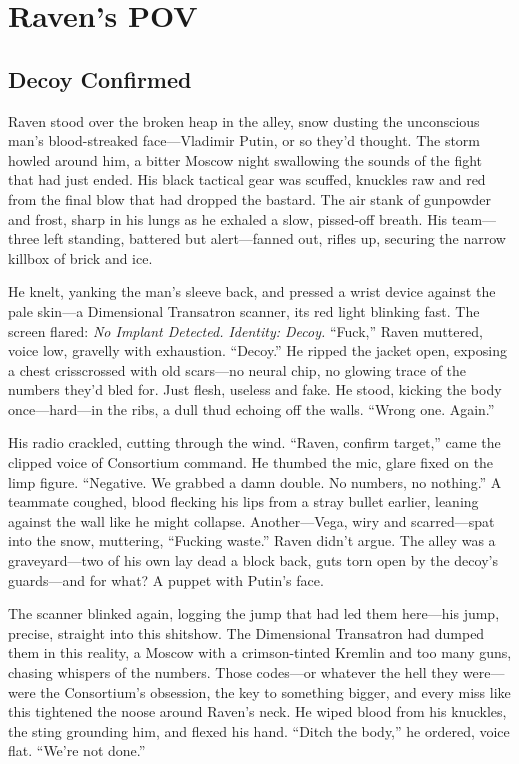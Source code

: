 \documentclass[12pt]{book}
\begin{document}
\chapter{Raven’s POV}

\section{Decoy Confirmed}

Raven stood over the broken heap in the alley, snow dusting the unconscious man’s blood-streaked face—Vladimir Putin, or so they’d thought. The storm howled around him, a bitter Moscow night swallowing the sounds of the fight that had just ended. His black tactical gear was scuffed, knuckles raw and red from the final blow that had dropped the bastard. The air stank of gunpowder and frost, sharp in his lungs as he exhaled a slow, pissed-off breath. His team—three left standing, battered but alert—fanned out, rifles up, securing the narrow killbox of brick and ice.

He knelt, yanking the man’s sleeve back, and pressed a wrist device against the pale skin—a Dimensional Transatron scanner, its red light blinking fast. The screen flared: \textit{No Implant Detected. Identity: Decoy.} “Fuck,” Raven muttered, voice low, gravelly with exhaustion. “Decoy.” He ripped the jacket open, exposing a chest crisscrossed with old scars—no neural chip, no glowing trace of the numbers they’d bled for. Just flesh, useless and fake. He stood, kicking the body once—hard—in the ribs, a dull thud echoing off the walls. “Wrong one. Again.”

His radio crackled, cutting through the wind. “Raven, confirm target,” came the clipped voice of Consortium command. He thumbed the mic, glare fixed on the limp figure. “Negative. We grabbed a damn double. No numbers, no nothing.” A teammate coughed, blood flecking his lips from a stray bullet earlier, leaning against the wall like he might collapse. Another—Vega, wiry and scarred—spat into the snow, muttering, “Fucking waste.” Raven didn’t argue. The alley was a graveyard—two of his own lay dead a block back, guts torn open by the decoy’s guards—and for what? A puppet with Putin’s face.

The scanner blinked again, logging the jump that had led them here—his jump, precise, straight into this shitshow. The Dimensional Transatron had dumped them in this reality, a Moscow with a crimson-tinted Kremlin and too many guns, chasing whispers of the numbers. Those codes—or whatever the hell they were—were the Consortium’s obsession, the key to something bigger, and every miss like this tightened the noose around Raven’s neck. He wiped blood from his knuckles, the sting grounding him, and flexed his hand. “Ditch the body,” he ordered, voice flat. “We’re not done.”
\end{document}
